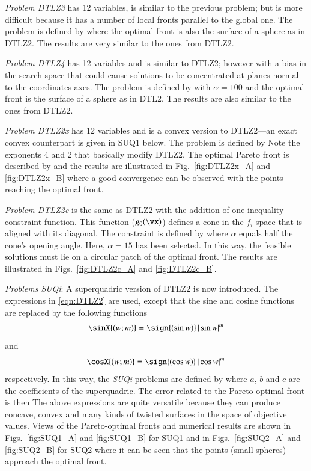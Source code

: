 \documentclass[final,5p,times,twocolumn]{elsarticle}
\newcommand{\figname} {Fig.}
\newcommand{\fignames}{Figs.}
\begin{document}
\emph{Problem DTLZ3} has 12 variables, is similar to the previous problem; but is more difficult
because it has a number of local fronts parallel to the global one. The problem is defined by
\DTLZthree
where the optimal front is also the surface of a sphere as in DTLZ2. The results are very similar
to the ones from DTLZ2.


\emph{Problem DTLZ4} has 12 variables and is similar to DTLZ2; however with a bias in the search
space that could cause solutions to be concentrated at planes normal to the coordinates axes. The
problem is defined by
\DTLZfour
with $\alpha=100$ and the optimal front is the surface of a sphere as in DTL2. The results are also
similar to the ones from DTLZ2.


\emph{Problem DTLZ2x} has 12 variables and is a convex version to DTLZ2---an exact convex
counterpart is given in SUQ1 below. The problem is defined by
\DTLZtwox
Note the exponents 4 and 2 that basically modify DTLZ2. The optimal Pareto front is described by
\DTLZtwoxAna
and the results are illustrated in \figname~\ref{fig:DTLZ2x_A} and \ref{fig:DTLZ2x_B} where a
good convergence can be observed with the points reaching the optimal front.


\emph{Problem DTLZ2c} is the same as DTLZ2 with the addition of one inequality constraint function.
This function ($g_0(\vx)$) defines a cone in the $f_i$ space that is aligned with its diagonal. The
constraint is defined by
\DTLZtwoc
where $\alpha$ equals half the cone's opening angle. Here, $\alpha=15$ has been selected. In this
way, the feasible solutions must lie on a circular patch of the optimal front. The results are
illustrated in \fignames~\ref{fig:DTLZ2c_A} and \ref{fig:DTLZ2c_B}.




\emph{Problems SUQi}: A superquadric version of DTLZ2 is now introduced. The expressions in
\ref{eqn:DTLZ2} are used, except that the sine and cosine functions are replaced by the following
functions
\begin{equation}
    \sinX{(w; m)} = \sign{(\sin{w})} \, |\sin{w}|^m
\end{equation}
and
\begin{equation}
    \cosX{(w; m)} = \sign{(\cos{w})} \, |\cos{w}|^m
\end{equation}
respectively. In this way, the \emph{SUQi} problems are defined by
\SUQi
where $a$, $b$ and $c$ are the coefficients of the superquadric.
The error related to the Pareto-optimal front is then
\SUQiAna
The above expressions are quite versatile because they can produce concave, convex and many kinds of
twisted surfaces in the space of objective values. Views of the Pareto-optimal fronts and numerical
results are shown in \fignames~\ref{fig:SUQ1_A} and \ref{fig:SUQ1_B} for SUQ1 and in
\fignames~\ref{fig:SUQ2_A} and \ref{fig:SUQ2_B} for SUQ2 where it can be seen that the points
(small spheres) approach the optimal front.
\end{document}
